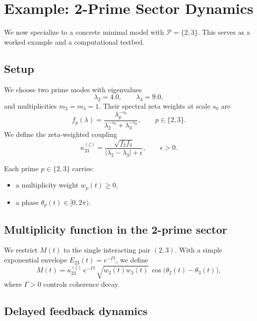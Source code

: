 \documentclass[11pt]{article}
\begin{document}
\section{Example: 2-Prime Sector Dynamics}

We now specialize to a concrete minimal model with \(\mathcal{P} = \{2,3\}\).
This serves as a worked example and a computational testbed.

\subsection{Setup}

We choose two prime modes with eigenvalues
\begin{equation}
  \lambda_2 = 4.0,
  \qquad
  \lambda_3 = 9.0,
\end{equation}
and multiplicities \(m_2 = m_3 = 1\).
Their spectral zeta weights at scale \(s_0\) are
\begin{equation}
  f_p(\lambda)
  =
  \frac{\lambda_p^{-s_0}}{\lambda_2^{-s_0} + \lambda_3^{-s_0}},
  \qquad p \in \{2,3\}.
\end{equation}
We define the zeta-weighted coupling
\begin{equation}
  \kappa_{23}^{(\zeta)}
  =
  \frac{\sqrt{f_2 f_3}}{|\lambda_2 - \lambda_3| + \epsilon},
  \qquad \epsilon > 0.
\end{equation}

Each prime \(p\in\{2,3\}\) carries:
\begin{itemize}
  \item a multiplicity weight \(w_p(t) \ge 0\),
  \item a phase \(\theta_p(t) \in [0,2\pi)\).
\end{itemize}

\subsection{Multiplicity function in the 2-prime sector}

We restrict \(M(t)\) to the single interacting pair \((2,3)\).
With a simple exponential envelope \(E_{23}(t) = e^{-\Gamma t}\), we define
\begin{equation}
  M(t)
  =
  \kappa_{23}^{(\zeta)}\, e^{-\Gamma t}\,
  \sqrt{w_2(t) w_3(t)}\,
  \cos\bigl(\theta_2(t) - \theta_3(t)\bigr),
\end{equation}
where \(\Gamma > 0\) controls coherence decay.

\subsection{Delayed feedback dynamics}
\end{document}
